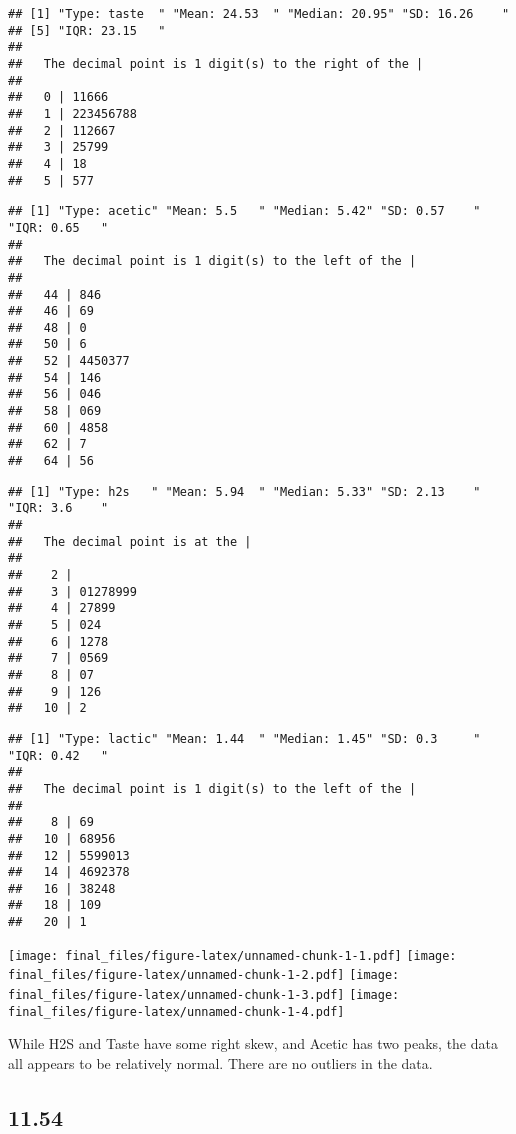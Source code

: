 \documentclass[]{article}
\begin{document}
\begin{verbatim}
## [1] "Type: taste  " "Mean: 24.53  " "Median: 20.95" "SD: 16.26    "
## [5] "IQR: 23.15   "
## 
##   The decimal point is 1 digit(s) to the right of the |
## 
##   0 | 11666
##   1 | 223456788
##   2 | 112667
##   3 | 25799
##   4 | 18
##   5 | 577
\end{verbatim}

\begin{verbatim}
## [1] "Type: acetic" "Mean: 5.5   " "Median: 5.42" "SD: 0.57    " "IQR: 0.65   "
## 
##   The decimal point is 1 digit(s) to the left of the |
## 
##   44 | 846
##   46 | 69
##   48 | 0
##   50 | 6
##   52 | 4450377
##   54 | 146
##   56 | 046
##   58 | 069
##   60 | 4858
##   62 | 7
##   64 | 56
\end{verbatim}

\begin{verbatim}
## [1] "Type: h2s   " "Mean: 5.94  " "Median: 5.33" "SD: 2.13    " "IQR: 3.6    "
## 
##   The decimal point is at the |
## 
##    2 | 
##    3 | 01278999
##    4 | 27899
##    5 | 024
##    6 | 1278
##    7 | 0569
##    8 | 07
##    9 | 126
##   10 | 2
\end{verbatim}

\begin{verbatim}
## [1] "Type: lactic" "Mean: 1.44  " "Median: 1.45" "SD: 0.3     " "IQR: 0.42   "
## 
##   The decimal point is 1 digit(s) to the left of the |
## 
##    8 | 69
##   10 | 68956
##   12 | 5599013
##   14 | 4692378
##   16 | 38248
##   18 | 109
##   20 | 1
\end{verbatim}

\texttt{[image: final\_files/figure-latex/unnamed-chunk-1-1.pdf]}
\texttt{[image: final\_files/figure-latex/unnamed-chunk-1-2.pdf]}
\texttt{[image: final\_files/figure-latex/unnamed-chunk-1-3.pdf]}
\texttt{[image: final\_files/figure-latex/unnamed-chunk-1-4.pdf]}

While H2S and Taste have some right skew, and Acetic has two peaks, the
data all appears to be relatively normal. There are no outliers in the
data.

\hypertarget{section-1}{%
\subsection{11.54}\label{section-1}}
\end{document}
